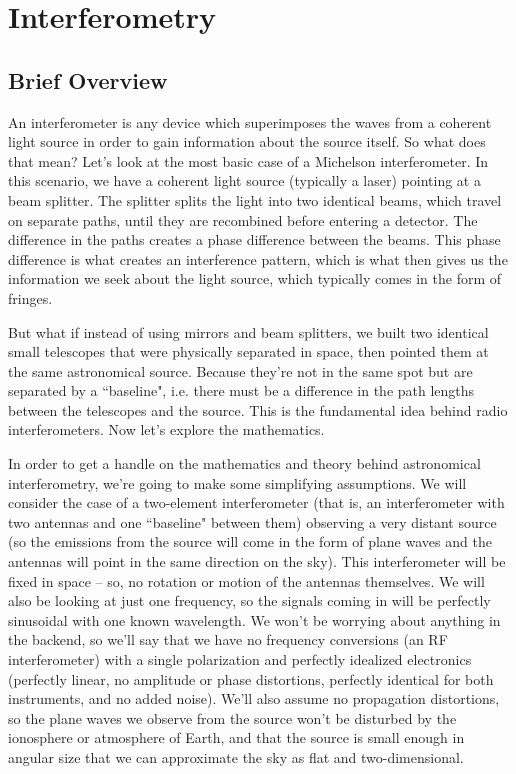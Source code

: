 \chapter{Interferometry}
\label{chap:interferometry}

\section{Brief Overview}
\label{sec:brief-overview}

An interferometer is any device which superimposes the waves from a coherent 
light source in order to gain information about the source itself. So what does 
that mean? Let's look at the most basic case of a Michelson interferometer. In 
this scenario, we have a coherent light source (typically a laser) pointing at 
a beam splitter. The splitter splits the light into two identical beams, which 
travel on separate paths, until they are recombined before entering a detector. 
The difference in the paths creates a phase difference between the beams. This 
phase difference is what creates an interference pattern, which is what then 
gives us the information we seek about the light source, which typically comes 
in the form of fringes. 

But what if instead of using mirrors and beam splitters, we built two identical 
small telescopes that were physically separated in space, then pointed them at 
the same astronomical source. Because they're not in the same spot but are 
separated by a ``baseline", i.e. there must be a difference in the path lengths 
between the telescopes and the source. This is the fundamental idea behind 
radio interferometers. Now let's explore the mathematics.

In order to get a handle on the mathematics and theory behind astronomical 
interferometry, we're going to make some simplifying assumptions. We will 
consider the case of a two-element interferometer (that is, an interferometer 
with two antennas and one ``baseline" between them) observing a very distant 
source (so the emissions from the source will come in the form of plane waves 
and the antennas will point in the same direction on the sky).  This 
interferometer will be fixed in space -- so, no rotation or motion of the 
antennas themselves.  We will also be looking at just one frequency, so the 
signals coming in will be perfectly sinusoidal with one known wavelength.  We 
won't be worrying about anything in the backend, so we'll say that we have no 
frequency conversions (an RF interferometer) with a single polarization and 
perfectly idealized electronics (perfectly linear, no amplitude or phase 
distortions, perfectly identical for both instruments, and no added noise).  
We'll also assume no propagation distortions, so the plane waves we observe 
from the source won't be disturbed by the ionosphere or atmosphere of Earth, 
and that the source is small enough in angular size that we can approximate the 
sky as flat and two-dimensional. 

